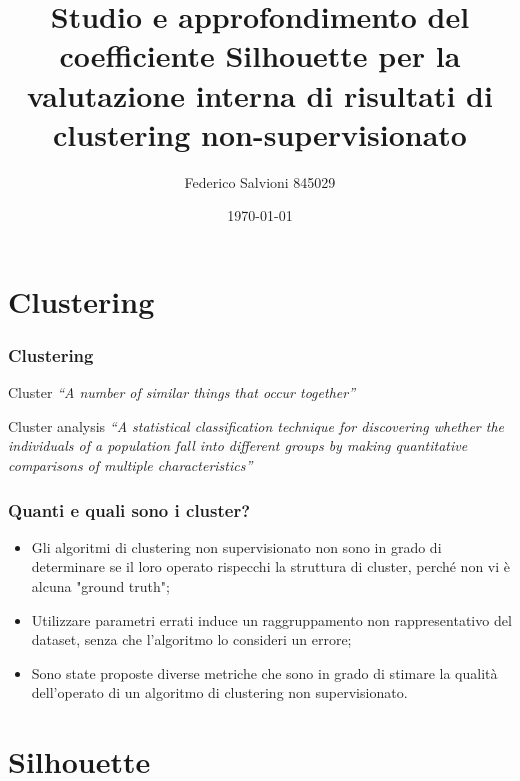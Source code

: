\documentclass{beamer}
\title{Studio e approfondimento del coefficiente Silhouette per la
valutazione interna di risultati di clustering non-supervisionato}
\author{Federico Salvioni 845029}
\date{\today}
\begin{document}
    \begin{frame}
        \titlepage
    \end{frame}

    \section{Clustering}

        \begin{frame}
            \frametitle{Clustering}

            \vfill

            \begin{block}{Cluster}
                \emph{``A number of similar things that occur together''}
            \end{block}

            \vfill

            \begin{block}{Cluster analysis}
                \emph{``A statistical classification technique for discovering
                      whether the individuals of a population fall into different groups
                      by making quantitative comparisons of multiple characteristics''}
            \end{block}
        \end{frame}

        \begin{frame}
            \frametitle{Quanti e quali sono i cluster?}

            \begin{itemize}
                \item
                Gli algoritmi di clustering non supervisionato non sono in
                grado di determinare se il loro operato rispecchi la struttura
                di cluster, perché non vi è alcuna "ground truth";
                \item
                Utilizzare parametri errati induce un raggruppamento non
                rappresentativo del dataset, senza che l'algoritmo lo
                consideri un errore;
                \item
                Sono state proposte diverse metriche che sono in grado di
                stimare la qualità dell'operato di un algoritmo di clustering
                non supervisionato.
            \end{itemize}
        \end{frame}

    \section{Silhouette}
\end{document}

